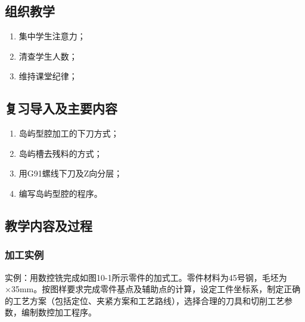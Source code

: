 \jxhj{%
	}

\makeshouye %

\subsection{组织教学}
\begin{enumerate}[\hspace{2em}1、]
	\item 集中学生注意力；
	\item 清查学生人数；
	\item 维持课堂纪律；
\end{enumerate}

\subsection{复习导入及主要内容}
\begin{enumerate}[1、]
\item 岛屿型腔加工的下刀方式；
\item 岛屿槽去残料的方式；
\item 用G91螺线下刀及Z向分层；
\item 编写岛屿型腔的程序。
\end{enumerate}

\subsection{教学内容及过程}
\subsubsection{加工实例}
实例：用数控铣完成如图10-1所示零件的加式工。零件材料为45号钢，毛坯为×35mm。按图样要求完成零件基点及辅助点的计算，设定工件坐标系，制定正确的工艺方案（包括定位、夹紧方案和工艺路线），选择合理的刀具和切削工艺参数，编制数控加工程序。

